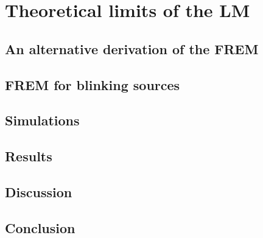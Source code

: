 \chapter{Theoretical limits of the LM}

\section{An alternative derivation of the FREM}


\section{FREM for blinking sources}


\section{Simulations}


\section{Results}


\section{Discussion}


\section{Conclusion}